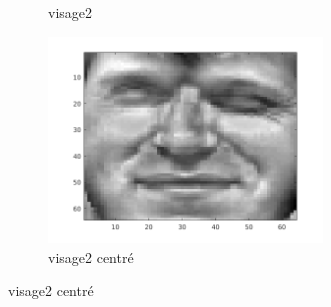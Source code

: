 \documentclass[a4paper]{article}
\begin{document}
\begin{figure}[H]
\begin{subfigure}[c]{0.24\textwidth}
        \caption{visage2}
        \label{subfig:ex1_x2}
    \end{subfigure}
    \begin{subfigure}[c]{0.24\textwidth}
        \centering
        \includegraphics[width=0.8\textwidth]{images/ex1_x2c.png}
        \caption{visage2 centré}
        \label{subfig:ex1_x2c}
    \end{subfigure}


\end{figure}
\end{document}
